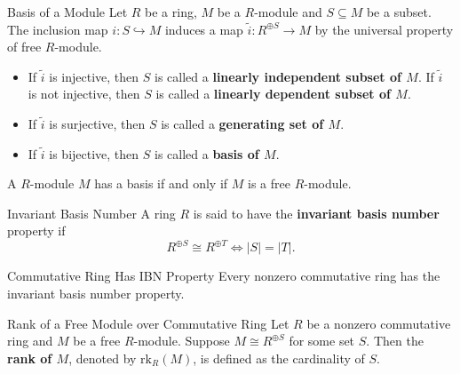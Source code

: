 \begin{definition}{Basis of a Module}{}
    Let $R$ be a ring, $M$ be a $R$-module and $S\subseteq M$ be a subset. The inclusion map $i:S\hookrightarrow M$ induces a map $\widetilde{i}:R^{\oplus S}\to M$ by the universal property of free $R$-module. 
    \begin{center}
    \end{center}
    \begin{itemize}
        \item If $\widetilde{i}$ is injective, then $S$ is called a \textbf{linearly independent subset of $M$}. If $\widetilde{i}$ is not injective, then $S$ is called a \textbf{linearly dependent subset of $M$}.
        \item If $\widetilde{i}$ is surjective, then $S$ is called a \textbf{generating set of $M$}. 
        \item If $\widetilde{i}$ is bijective, then $S$ is called a \textbf{basis of $M$}.
    \end{itemize}
\end{definition}

\begin{proposition}{}{}
    A $R$-module $M$ has a basis if and only if $M$ is a free $R$-module.
\end{proposition}

\begin{definition}{Invariant Basis Number}{}
    A ring $R$ is said to have the \textbf{invariant basis number} property if 
    \[
    R^{\oplus S}\cong R^{\oplus T}\iff |S|=|T|.
    \]
\end{definition}

\begin{proposition}{Commutative Ring Has IBN Property}{}
    Every nonzero commutative ring has the invariant basis number property.
\end{proposition}

\begin{definition}{Rank of a Free Module over Commutative Ring}{}
    Let $R$ be a nonzero commutative ring and $M$ be a free $R$-module. Suppose $M\cong R^{\oplus S}$ for some set $S$. Then the \textbf{rank of $M$}, denoted by $\mathrm{rk}_R(M)$, is defined as the cardinality of $S$.
\end{definition}



